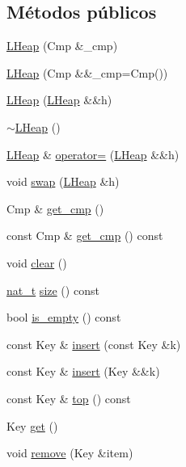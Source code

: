 \subsection*{Métodos públicos}
\begin{DoxyCompactItemize}
\item 
\hyperlink{class_designar_1_1_l_heap_ad645d2b25a8a0cbd4ccfcab02eee1740}{L\+Heap} (Cmp \&\+\_\+cmp)
\item 
\hyperlink{class_designar_1_1_l_heap_a38871440fd0a6f313ed2034e0b85d723}{L\+Heap} (Cmp \&\&\+\_\+cmp=Cmp())
\item 
\hyperlink{class_designar_1_1_l_heap_aacf981076833b8ae14c2f931f76bd4d0}{L\+Heap} (\hyperlink{class_designar_1_1_l_heap}{L\+Heap} \&\&h)
\item 
\hyperlink{class_designar_1_1_l_heap_ae8222af1e06c39acc9ae21589c70b874}{$\sim$\+L\+Heap} ()
\item 
\hyperlink{class_designar_1_1_l_heap}{L\+Heap} \& \hyperlink{class_designar_1_1_l_heap_a734877d8fa46c22a5e11eb18d3221c55}{operator=} (\hyperlink{class_designar_1_1_l_heap}{L\+Heap} \&\&h)
\item 
void \hyperlink{class_designar_1_1_l_heap_ad8231f41b79545dc4655d401ba1d4fc2}{swap} (\hyperlink{class_designar_1_1_l_heap}{L\+Heap} \&h)
\item 
Cmp \& \hyperlink{class_designar_1_1_l_heap_a2c704057a03ec82052cf916142709506}{get\+\_\+cmp} ()
\item 
const Cmp \& \hyperlink{class_designar_1_1_l_heap_a2cb81067a531983f16aba240cd2dcde5}{get\+\_\+cmp} () const
\item 
void \hyperlink{class_designar_1_1_l_heap_a19ea9506d108cdb3662f936e21483c1d}{clear} ()
\item 
\hyperlink{namespace_designar_aa72662848b9f4815e7bf31a7cf3e33d1}{nat\+\_\+t} \hyperlink{class_designar_1_1_l_heap_ad5d78ccd18f1352b55b3daf3592a9fdd}{size} () const
\item 
bool \hyperlink{class_designar_1_1_l_heap_a03ae70dddd0511210308b666c69c75e5}{is\+\_\+empty} () const
\item 
const Key \& \hyperlink{class_designar_1_1_l_heap_afda890a8ad2058013a93ec6b3dbcb38d}{insert} (const Key \&k)
\item 
const Key \& \hyperlink{class_designar_1_1_l_heap_a45e3853d6d7cd17fd5b56aa572fd6042}{insert} (Key \&\&k)
\item 
const Key \& \hyperlink{class_designar_1_1_l_heap_a3251c1ef23f6d8f30dec65b8c500d506}{top} () const
\item 
Key \hyperlink{class_designar_1_1_l_heap_ae8fe8b715ed64d66763a20e409b76bd3}{get} ()
\item 
void \hyperlink{class_designar_1_1_l_heap_aa04116770ec4bdd66f83ecd19677ce01}{remove} (Key \&item)
\end{DoxyCompactItemize}


